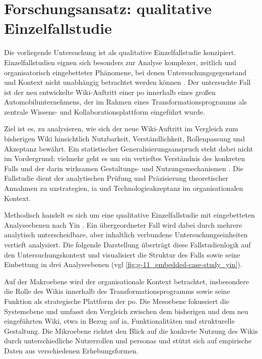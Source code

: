 \section{Forschungsansatz: qualitative Einzelfallstudie}
\label{sec:04-01_case-study-approach}

Die vorliegende Untersuchung ist als qualitative Einzelfallstudie konzipiert. Einzelfallstudien eignen sich besonders zur Analyse komplexer, zeitlich und organisatorisch eingebetteter Phänomene, bei denen Untersuchungsgegenstand und Kontext nicht unabhängig betrachtet werden können \cite{404:Yin2018}. Der untersuchte Fall ist der neu entwickelte Wiki-Auftritt einer \acrlong{po} innerhalb eines großen Automobilunternehmens, der im Rahmen eines Transformationsprogramms als zentrale Wissens- und Kollaborationsplattform eingeführt wurde.

Ziel ist es, zu analysieren, wie sich der neue Wiki-Auftritt im Vergleich zum bisherigen Wiki hinsichtlich Nutzbarkeit, Verständlichkeit, Rollenpassung und Akzeptanz bewährt. Ein statistischer Generalisierungsanspruch steht dabei nicht im Vordergrund; vielmehr geht es um ein vertieftes Verständnis des konkreten Falls und der darin wirksamen Gestaltungs- und Nutzungsmechanismen \cite{404:Yin2018}. Die Fallstudie dient der analytischen Prüfung und Präzisierung theoretischer Annahmen zu \Gls{uxstrategien}, \Gls{ia} und Technologieakzeptanz im organisationalen Kontext.

Methodisch handelt es sich um eine qualitative Einzelfallstudie mit eingebetteten Analyseebenen nach Yin \cite{404:Yin2018}. Ein übergeordneter Fall wird dabei durch mehrere analytisch unterscheidbare, aber inhaltlich verbundene Untersuchungseinheiten vertieft analysiert. Die folgende Darstellung überträgt diese Fallstudienlogik auf den Untersuchungskontext und visualisiert die Struktur des Falls sowie seine Einbettung in drei Analyseebenen (\acrshort{vgl} \autoref{fig:g-11_embedded-case-study_yin}).


Auf der Makroebene wird der organisationale Kontext betrachtet, insbesondere die Rolle des Wikis innerhalb des Transformationsprogramms sowie seine Funktion als strategische Plattform der \acrlong{po}. Die Mesoebene fokussiert die Systemebene und umfasst den Vergleich zwischen dem bisherigen und dem neu eingeführten Wiki, etwa in Bezug auf \Gls{ia}, Funktionalitäten und strukturelle Gestaltung. Die Mikroebene richtet den Blick auf die konkrete Nutzung des Wikis durch unterschiedliche Nutzerrollen und \Gls{personas} und stützt sich auf empirische Daten aus verschiedenen Erhebungsformen.

